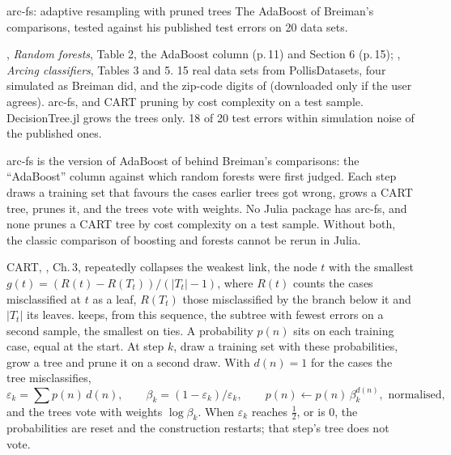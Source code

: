 



  {arc-fs: adaptive resampling with pruned trees}
  {The AdaBoost of Breiman's comparisons, tested against his published test errors on 20 data sets.}

\factsheet
  {, \emph{Random forests}, Table 2, the AdaBoost column (p.\,11) and Section 6 (p.\,15); ,
   \emph{Arcing classifiers}, Tables 3 and 5. 15 real data sets from PollisDatasets, four simulated as Breiman did, and the
   zip-code digits of  (downloaded only if the user agrees).}
  {arc-fs, and CART pruning by cost complexity on a test sample. DecisionTree.jl grows the trees only.}
  {}
  {18 of 20 test errors within simulation noise of the published ones.}

arc-fs is the version of AdaBoost of  behind Breiman's comparisons: the ``AdaBoost'' column against
which random forests were first judged. Each step draws a training set that favours the cases earlier trees got wrong, grows a
CART tree, prunes it, and the trees vote with weights. No Julia package has arc-fs, and none prunes a CART tree by cost
complexity on a test sample. Without both, the classic comparison of boosting and forests cannot be rerun in Julia.

CART, , Ch.\,3, repeatedly collapses the weakest link, the node $t$ with the smallest
$g(t) = (R(t) - R(T_t))/(|T_t| - 1)$, where $R(t)$ counts the cases misclassified at $t$ as a leaf, $R(T_t)$ those
misclassified by the branch below it and $|T_t|$ its leaves.  keeps, from this sequence, the subtree with fewest
errors on a second sample, the smallest on ties.
A probability $p(n)$ sits on each training case, equal at the start. At step $k$, draw a training set with these probabilities,
grow a tree and prune it on a second draw. With $d(n) = 1$ for the cases the tree misclassifies,
\[ \varepsilon_k = \textstyle\sum p(n)\,d(n), \qquad \beta_k = (1-\varepsilon_k)/\varepsilon_k, \qquad
   p(n) \leftarrow p(n)\,\beta_k^{d(n)}, \text{ normalised}, \]
and the trees vote with weights $\log\beta_k$. When $\varepsilon_k$ reaches $\tfrac12$, or is 0, the probabilities are reset
and the construction restarts; that step's tree does not vote.

